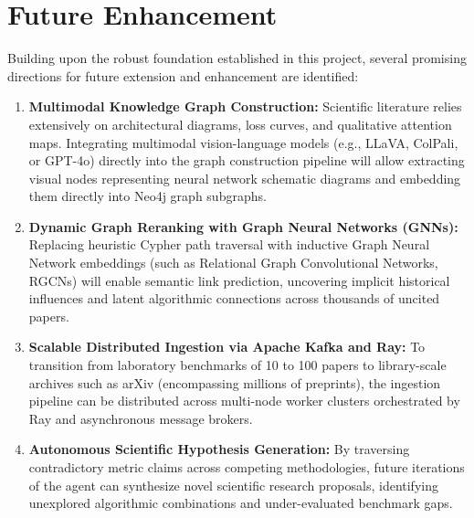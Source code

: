 \section{Future Enhancement}
\label{sec:future_enhancement}
Building upon the robust foundation established in this project, several promising directions for future extension and enhancement are identified:
\begin{enumerate}
    \item \textbf{Multimodal Knowledge Graph Construction:} Scientific literature relies extensively on architectural diagrams, loss curves, and qualitative attention maps. Integrating multimodal vision-language models (e.g., LLaVA, ColPali, or GPT-4o) directly into the graph construction pipeline will allow extracting visual nodes representing neural network schematic diagrams and embedding them directly into Neo4j graph subgraphs.
    \item \textbf{Dynamic Graph Reranking with Graph Neural Networks (GNNs):} Replacing heuristic Cypher path traversal with inductive Graph Neural Network embeddings (such as Relational Graph Convolutional Networks, RGCNs) will enable semantic link prediction, uncovering implicit historical influences and latent algorithmic connections across thousands of uncited papers.
    \item \textbf{Scalable Distributed Ingestion via Apache Kafka and Ray:} To transition from laboratory benchmarks of 10 to 100 papers to library-scale archives such as arXiv (encompassing millions of preprints), the ingestion pipeline can be distributed across multi-node worker clusters orchestrated by Ray and asynchronous message brokers.
    \item \textbf{Autonomous Scientific Hypothesis Generation:} By traversing contradictory metric claims across competing methodologies, future iterations of the agent can synthesize novel scientific research proposals, identifying unexplored algorithmic combinations and under-evaluated benchmark gaps.
\end{enumerate}

